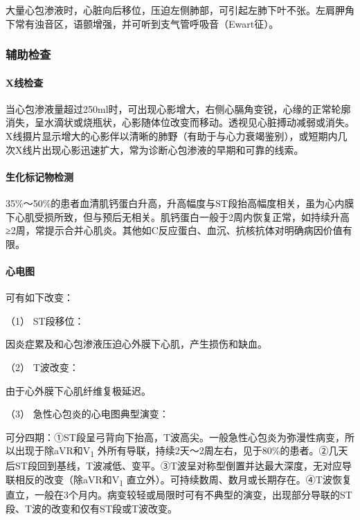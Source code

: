 大量心包渗液时，心脏向后移位，压迫左侧肺部，可引起左肺下叶不张。左肩胛角下常有浊音区，语颤增强，并可听到支气管呼吸音（Ewart征）。

\subsubsection{辅助检查}

\paragraph{X线检查}

当心包渗液量超过250ml时，可出现心影增大，右侧心膈角变锐，心缘的正常轮廓消失，呈水滴状或烧瓶状，心影随体位改变而移动。透视见心脏搏动减弱或消失。X线摄片显示增大的心影伴以清晰的肺野（有助于与心力衰竭鉴别），或短期内几次X线片出现心影迅速扩大，常为诊断心包渗液的早期和可靠的线索。

\paragraph{生化标记物检测}

35\%～50\%的患者血清肌钙蛋白升高，升高幅度与ST段抬高幅度相关，虽为心内膜下心肌受损所致，但与预后无相关。肌钙蛋白一般于2周内恢复正常，如持续升高≥2周，常提示合并心肌炎。其他如C反应蛋白、血沉、抗核抗体对明确病因价值有限。

\paragraph{心电图}

可有如下改变：

\hypertarget{text00302.htmlux5cux23CHP10-4-2-2-3-1}{}
（1） ST段移位：

因炎症累及和心包渗液压迫心外膜下心肌，产生损伤和缺血。

\hypertarget{text00302.htmlux5cux23CHP10-4-2-2-3-2}{}
（2） T波改变：

由于心外膜下心肌纤维复极延迟。

\hypertarget{text00302.htmlux5cux23CHP10-4-2-2-3-3}{}
（3） 急性心包炎的心电图典型演变：

可分四期：①ST段呈弓背向下抬高，T波高尖。一般急性心包炎为弥漫性病变，所以出现于除aVR和V\textsubscript{1}
外所有导联，持续2天～2周左右，见于80\%的患者。②几天后ST段回到基线，T波减低、变平。③T波呈对称型倒置并达最大深度，无对应导联相反的改变（除aVR和V\textsubscript{1}
直立外）。可持续数周、数月或长期存在。④T波恢复直立，一般在3个月内。病变较轻或局限时可有不典型的演变，出现部分导联的ST段、T波的改变和仅有ST段或T波改变。


